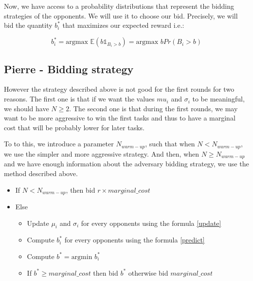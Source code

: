 \documentclass[11pt]{article}
\begin{document}
Now, we have access to a probability distributions that represent the bidding strategies of the opponents. We will use it to choose our bid. Precisely, we will bid the quantity $b^*_i$ that maximizes our expected reward i.e.:

\begin{equation}
b^*_i = \text{argmax }\mathbb{E}(b\mathds{1}_{B_i > b}) = \text{argmax }bPr(B_i > b)
\label{predict}
\end{equation}

\subsection{Pierre - Bidding strategy}

However the strategy described above is not good for the first rounds for two reasons. The first one is that if we want the values $mu_i$ and $\sigma_i$ to be meaningful, we should have $N \geq 2$. The second one is that during the first rounds, we may want to be more aggressive to win the first tasks and thus to have a marginal cost that will be probably lower for later tasks.

To to this, we introduce a parameter $N_{warm-up}$, such that when $N < N_{warm-up}$, we use the simpler and more aggressive strategy. And then, when $N \geq N_{warm-up}$ and we have enough information about the adversary bidding strategy, we use the method described above.

\begin{itemize}
\item If $N < N_{warm-up}$, then bid $r \times marginal\_cost$
\item Else
\begin{itemize}
	\item Update $\mu_i$ and $\sigma_i$ for every opponents using the formula \ref{update}
	\item Compute $b^*_i$ for every opponents using the formula \ref{predict}
	\item Compute $b^* = \text{argmin } b^*_i$
	\item If $b^* \geq marginal\_cost$ then bid $b^*$ otherwise bid $marginal\_cost$
\end{itemize}
\end{itemize}

\end{document}
